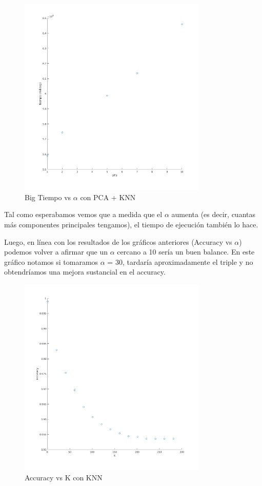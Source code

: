 \begin{figure}[H]
	\centering	\includegraphics[width=0.8\textwidth]{img/big_alfa_pca_tiempo.png}
	\caption{Big Tiempo vs $\alpha$ con PCA + KNN}
	\label{fig:Big Tiempo vs Alpha con PCA + KNN}
\end{figure}

Tal como esperabamos vemos que a medida que el $\alpha$ aumenta (es decir, cuantas más componentes principales tengamos), el tiempo de ejecución también lo hace.

Luego, en línea con los resultados de los gráficos anteriores (Accuracy vs $\alpha$) podemos volver a afirmar que un $\alpha$ cercano a 10 sería un buen balance. En este gráfico notamos si tomaramos $\alpha$ = 30, tardaría aproximadamente el triple y no obtendríamos una mejora sustancial en el accuracy.


\begin{figure}[H]
	\centering	\includegraphics[width=0.8\textwidth]{img/k_knn_accu.png}
	\caption{Accuracy vs K con KNN}
	\label{fig:Accuracy vs K con KNN}
\end{figure}

